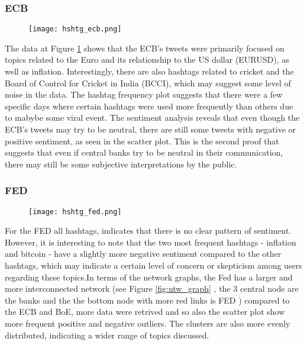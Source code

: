 \documentclass[fleqn,10pt]{SelfArx} %
\begin{document}
\subsubsection{ECB}
\begin{figure}[ht]\centering
	\texttt{[image: hshtg\_ecb.png]}
	\caption{}
	\label{fig:ecb_hshtg}
\end{figure}

The data at Figure  \ref{fig:ecb_hshtg} shows that the ECB's tweets were primarily focused on topics related to the Euro and its relationship to the US dollar (EURUSD), as well as inflation. Interestingly, there are also hashtags related to cricket and the Board of Control for Cricket in India (BCCI), which may suggest some level of noise in the data. The hashtag frequency plot suggests that there were a few specific days where certain hashtags were used more frequently than others due to mabybe some viral event. The sentiment analysis reveals that even though the ECB's tweets may try to be neutral, there are still some tweets with negative or positive sentiment, as seen in the scatter plot. This is the second proof that suggests that even if central banks try to be neutral in their communication, there may still be some subjective interpretations by the public. 

\subsubsection{FED}
\begin{figure}[ht]\centering
	\texttt{[image: hshtg\_fed.png]}
	\caption{}
	\label{fig:fed_hshtg}
\end{figure}

For the FED all hashtags, indicates that there is no clear pattern of sentiment. However, it is interesting to note that the two most frequent hashtags - inflation and bitcoin - have a slightly more negative sentiment compared to the other hashtags, which may indicate a certain level of concern or skepticism among users regarding these topics.In terms of the network graphs, the Fed has a larger and more interconnected network (see Figure \ref{fig:ntw_graph} , the 3 central node are the banks and the the bottom node with more red links is FED ) compared to the ECB and BoE, more data were retrived and so also the scatter plot show more frequent positive and negative outliers. The clusters are also more evenly distributed, indicating a wider range of topics discussed.
\end{document}
